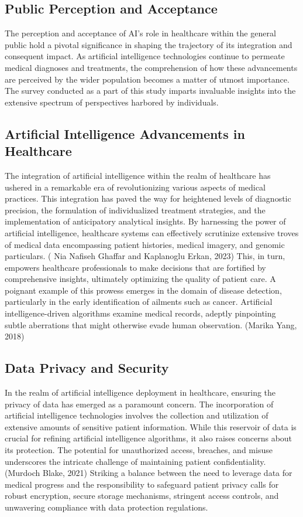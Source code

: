 \documentclass{ieeeaccess}
\begin{document}
\subsection{Public Perception and Acceptance}
The perception and acceptance of AI's role in healthcare within the general public hold a pivotal significance in shaping the trajectory of its integration and consequent impact. As artificial intelligence technologies continue to permeate medical diagnoses and treatments, the comprehension of how these advancements are perceived by the wider population becomes a matter of utmost importance. The survey conducted as a part of this study imparts invaluable insights into the extensive spectrum of perspectives harbored by individuals.

\subsection{Artificial Intelligence Advancements in Healthcare}
The integration of artificial intelligence within the realm of healthcare has ushered in a remarkable era of revolutionizing various aspects of medical practices. This integration has paved the way for heightened levels of diagnostic precision, the formulation of individualized treatment strategies, and the implementation of anticipatory analytical insights. By harnessing the power of artificial intelligence, healthcare systems can effectively scrutinize extensive troves of medical data encompassing patient histories, medical imagery, and genomic particulars. ( Nia Nafiseh Ghaffar and Kaplanoglu Erkan, 2023) This, in turn, empowers healthcare professionals to make decisions that are fortified by comprehensive insights, ultimately optimizing the quality of patient care. A poignant example of this prowess emerges in the domain of disease detection, particularly in the early identification of ailments such as cancer. Artificial intelligence-driven algorithms examine medical records, adeptly pinpointing subtle aberrations that might otherwise evade human observation. (Marika Yang, 2018)

\subsection{Data Privacy and Security}
In the realm of artificial intelligence deployment in healthcare, ensuring the privacy of data has emerged as a paramount concern. The incorporation of artificial intelligence technologies involves the collection and utilization of extensive amounts of sensitive patient information. While this reservoir of data is crucial for refining artificial intelligence algorithms, it also raises concerns about its protection. The potential for unauthorized access, breaches, and misuse underscores the intricate challenge of maintaining patient confidentiality. (Murdoch Blake, 2021) Striking a balance between the need to leverage data for medical progress and the responsibility to safeguard patient privacy calls for robust encryption, secure storage mechanisms, stringent access controls, and unwavering compliance with data protection regulations.
\end{document}

